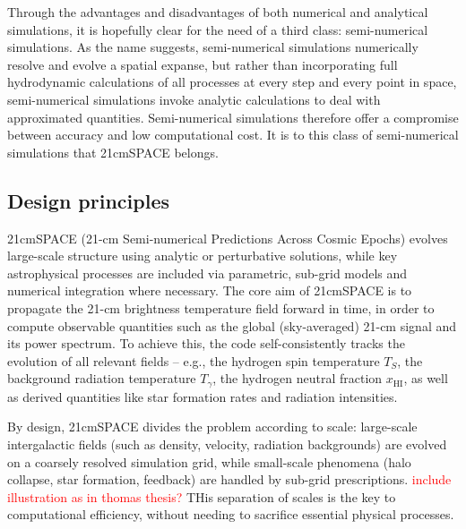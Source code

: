 \documentclass[floats,floatfix,showpacs,amssymb,prd,superscriptaddress,nofootinbib]{revtex4-2} %
\newcommand{\red}{\textcolor{red}}
\begin{document}
Through the advantages and disadvantages of both numerical and analytical simulations, it is hopefully clear for the need of a third class: semi-numerical simulations. As the name suggests, semi-numerical simulations numerically resolve and evolve a spatial expanse, but rather than incorporating full hydrodynamic calculations of all processes at every step and every point in space, semi-numerical simulations invoke analytic calculations to deal with approximated quantities. Semi-numerical simulations therefore offer a compromise between accuracy and low computational cost. It is to this class of semi-numerical simulations that 21cmSPACE belongs.


\subsection{Design principles}
21cmSPACE (21-cm Semi-numerical Predictions Across Cosmic Epochs) evolves large-scale structure using analytic or perturbative solutions, while key astrophysical processes are included via parametric, sub-grid models and numerical integration where necessary. The core aim of 21cmSPACE is to propagate the 21-cm brightness temperature field forward in time, in order to compute observable quantities such as the global (sky-averaged) 21-cm signal and its power spectrum. To achieve this, the code self-consistently tracks the evolution of all relevant fields -- e.g., the hydrogen spin temperature $T_S$, the background radiation temperature $T_\gamma$, the hydrogen neutral fraction $x_{\text{HI}}$, as well as derived quantities like star formation rates and radiation intensities.

By design, 21cmSPACE divides the problem according to scale: large-scale intergalactic fields (such as density, velocity, radiation backgrounds) are evolved on a coarsely resolved simulation grid, while small-scale phenomena (halo collapse, star formation, feedback) are handled by sub-grid prescriptions. \red{include illustration as in thomas thesis?} THis separation of scales is the key to computational efficiency, without needing to sacrifice essential physical processes.
\end{document}

